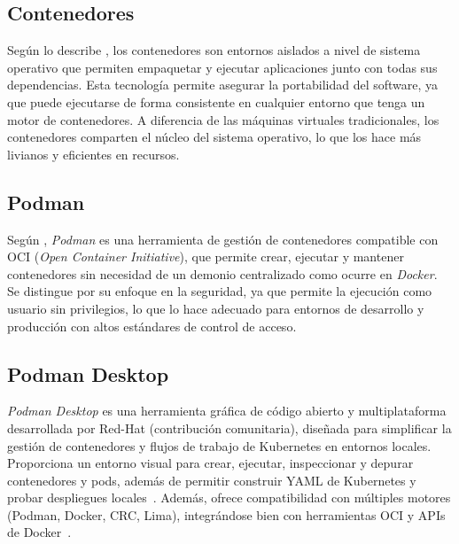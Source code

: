 \documentclass[12pt]{article}
\begin{document}
	\subsection*{Contenedores}

	\hspace{1.27cm}Según lo describe \textcite{merkel2014}, los contenedores son entornos aislados a nivel de sistema operativo que permiten empaquetar y ejecutar aplicaciones junto con todas sus dependencias. Esta tecnología permite asegurar la portabilidad del software, ya que puede ejecutarse de forma consistente en cualquier entorno que tenga un motor de contenedores. A diferencia de las máquinas virtuales tradicionales, los contenedores comparten el núcleo del sistema operativo, lo que los hace más livianos y eficientes en recursos.

	\subsection*{Podman}

	\hspace{1.27cm}Según \textcite{redhat2021}, \textit{Podman} es una herramienta de gestión de contenedores compatible con OCI (\textit{Open Container Initiative}), que permite crear, ejecutar y mantener contenedores sin necesidad de un demonio centralizado como ocurre en \textit{Docker}. Se distingue por su enfoque en la seguridad, ya que permite la ejecución como usuario sin privilegios, lo que lo hace adecuado para entornos de desarrollo y producción con altos estándares de control de acceso.

	\subsection*{Podman Desktop}
	\hspace{1.27cm}\textit{Podman Desktop} es una herramienta gráfica de código abierto y multiplataforma desarrollada por Red-Hat (contribución comunitaria), diseñada para simplificar la gestión de contenedores y flujos de trabajo de Kubernetes en entornos locales. Proporciona un entorno visual para crear, ejecutar, inspeccionar y depurar contenedores y pods, además de permitir construir YAML de Kubernetes y probar despliegues locales \parencite{redhat_podman_desktop,georger2024}. Además, ofrece compatibilidad con múltiples motores (Podman, Docker, CRC, Lima), integrándose bien con herramientas OCI y APIs de Docker \parencite{podman_desktop_multi}.
\end{document}
